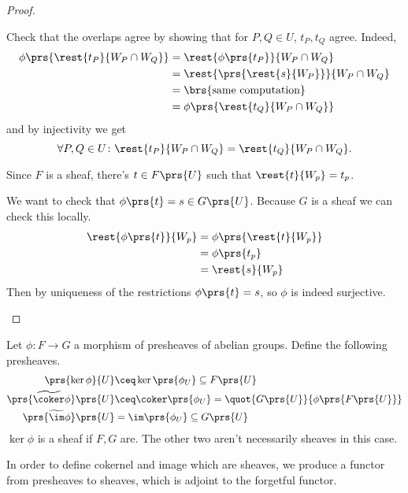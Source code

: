 \documentclass[10pt,a4paper,twoside,openany,hidelinks]{book}
\begin{document}
\begin{proof}
\begin{description}
\begin{description}
Check that the overlaps agree by showing that for $P,Q \in U$, $t_P, t_Q$ agree.
Indeed,
\begin{align*}
\phi\prs{\rest{t_P}{W_P \cap W_Q}} &= \rest{\phi\prs{t_P}}{W_P \cap W_Q}
\\&=
\rest{\prs{\rest{s}{W_P}}}{W_P \cap W_Q}
\\&= \brs{\text{same computation}}
\\&= \phi\prs{\rest{t_Q}{W_P \cap W_Q}}
\end{align*}
and by injectivity we get
\[\forall P,Q \in U \colon \rest{t_P}{W_P \cap W_Q} = \rest{t_Q}{W_P \cap W_Q} \text{.}\]

Since $F$ is a sheaf, there's $t \in F\prs{U}$ such that $\rest{t}{W_p} = t_p$.

We want to check that $\phi\prs{t} = s \in G\prs{U}$. Because $G$ is a sheaf we can check this locally.
\begin{align*}
\rest{\phi\prs{t}}{W_p} &= \phi\prs{\rest{t}{W_p}}
\\&=
\phi\prs{t_p}
\\&=
\rest{s}{W_p}
\end{align*}
Then by uniqueness of the restrictions $\phi\prs{t} = s$, so $\phi$ is indeed surjective.
\end{description}
\end{description}
\end{proof}

\begin{definition}
Let $\phi \colon F \to G$ a morphism of presheaves of abelian groups. Define the following presheaves.
\begin{align*}
\prs{\ker \phi}{U} &\ceq \ker\prs{\phi_U} \subseteq F\prs{U} \\
\prs{\widetilde{\coker}\phi}\prs{U} &\ceq \coker\prs{\phi_U} = \quot{G\prs{U}}{\phi\prs{F\prs{U}}} \\
\prs{\widetilde{\im}\phi}\prs{U} &= \im\prs{\phi_U} \subseteq G\prs{U}
\end{align*}
$\ker \phi$ is a sheaf if $F,G$ are. The other two aren't necessarily sheaves in this case.
\end{definition}

In order to define cokernel and image which are sheaves, we produce a functor from presheaves to sheaves, which is adjoint to the forgetful functor.
\end{document}
